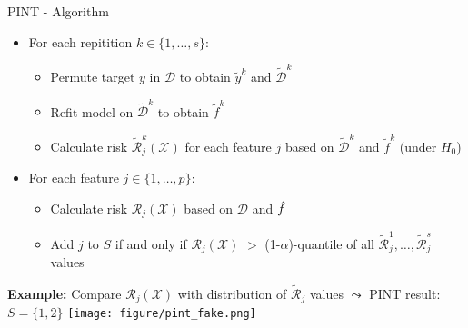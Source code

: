 \documentclass[11pt,compress,t,notes=noshow, aspectratio=169, xcolor=table,dvipsnames]{beamer}
\begin{document}
\begin{frame}{PINT - Algorithm}

\begin{itemize}
    \item For each repitition $k \in \{1, \ldots, s\}$:
        \begin{itemize}
            \item Permute target $y$ in $\mathcal{D}$ to obtain $\tilde{y}^{k}$ and $\tilde{\mathcal{D}}^{k}$
            \item Refit model on $\tilde{\mathcal{D}}^{k}$ to obtain $\tilde{f}^{k}$
            \item %
            Calculate risk $\tilde{\mathcal{R}}_j^{k}(\mathcal{X})$ for each feature $j$ based on $\tilde{\mathcal{D}}^{k}$ and $\tilde{f}^{k}$ (under $H_0$)
        \end{itemize}
    \item For each feature $j \in \{1, \ldots, p\}$:
        \begin{itemize}
            \item Calculate risk {\color{red}$\mathcal{R}_j(\mathcal{X})$} based on $\mathcal{D}$ and $\hat{f}$
            \item Add $j$ to $S$ if and only if {\color{red}$\mathcal{R}_j(\mathcal{X})$} $>$ (1-$\alpha$)-quantile of all $\tilde{\mathcal{R}}_j^1, \dots, \tilde{\mathcal{R}}_j^s$ values
        \end{itemize}
\end{itemize}

\textbf{Example:} Compare {\color{red}$\mathcal{R}_j(\mathcal{X})$} 
with distribution of $\tilde{\mathcal{R}}_j$ values
$\leadsto$ PINT result: $S = \{1, 2\}$
        \texttt{[image: figure/pint\_fake.png]}
\end{frame}
\end{document}
